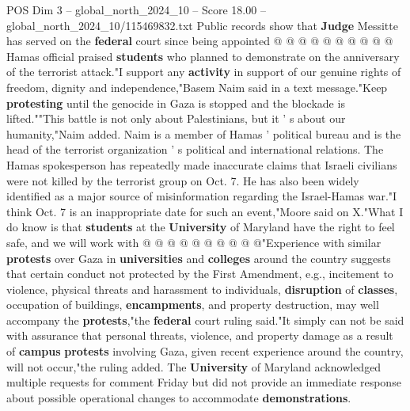 \begin{textsample}{POS Dim 3 – global\_north\_2024\_10 – Score 18.00 – global\_north\_2024\_10/115469832.txt}
Public records show that \textbf{Judge} Messitte has served on the \textbf{federal} court since being appointed @ @ @ @ @ @ @ @ @ @ Hamas official praised \textbf{students} who planned to demonstrate on the anniversary of the terrorist attack."I support any \textbf{activity} in support of our genuine rights of freedom, dignity and independence,"Basem Naim said in a text message."Keep \textbf{protesting} until the genocide in Gaza is stopped and the blockade is lifted.""This battle is not only about Palestinians, but it ' s about our humanity,"Naim added.
Naim is a member of Hamas ' political bureau and is the head of the terrorist organization ' s political and international relations.
The Hamas spokesperson has repeatedly made inaccurate claims that Israeli civilians were not killed by the terrorist group on Oct. 7.
He has also been widely identified as a major source of misinformation regarding the Israel-Hamas war."I think Oct. 7 is an inappropriate date for such an event,"Moore said on X."What I do know is that \textbf{students} at the \textbf{University} of Maryland have the right to feel safe, and we will work with @ @ @ @ @ @ @ @ @ @"Experience with similar \textbf{protests} over Gaza in \textbf{universities} and \textbf{colleges} around the country suggests that certain conduct not protected by the First Amendment, e.g., incitement to violence, physical threats and harassment to individuals, \textbf{disruption} of \textbf{classes}, occupation of buildings, \textbf{encampments}, and property destruction, may well accompany the \textbf{protests},"the \textbf{federal} court ruling said."It simply can not be said with assurance that personal threats, violence, and property damage as a result of \textbf{campus} \textbf{protests} involving Gaza, given recent experience around the country, will not occur,"the ruling added.
The \textbf{University} of Maryland acknowledged multiple requests for comment Friday but did not provide an immediate response about possible operational changes to accommodate \textbf{demonstrations}.

\end{textsample}
